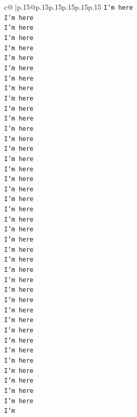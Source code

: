\documentclass{article}
\begin{document}
{\begin{supertabular}{c@{$\;$}|p{.15\linewidth}@{}p{.15\linewidth}p{.15\linewidth}p{.15\linewidth}p{.15\linewidth}p{.15\linewidth}}
{{{\texttt{I'm here} \\
\texttt{I'm here} \\
\texttt{I'm here} \\
\texttt{I'm here} \\
\texttt{I'm here} \\
\texttt{I'm here} \\
\texttt{I'm here} \\
\texttt{I'm here} \\
\texttt{I'm here} \\
\texttt{I'm here} \\
\texttt{I'm here} \\
\texttt{I'm here} \\
\texttt{I'm here} \\
\texttt{I'm here} \\
\texttt{I'm here} \\
\texttt{I'm here} \\
\texttt{I'm here} \\
\texttt{I'm here} \\
\texttt{I'm here} \\
\texttt{I'm here} \\
\texttt{I'm here} \\
\texttt{I'm here} \\
\texttt{I'm here} \\
\texttt{I'm here} \\
\texttt{I'm here} \\
\texttt{I'm here} \\
\texttt{I'm here} \\
\texttt{I'm here} \\
\texttt{I'm here} \\
\texttt{I'm here} \\
\texttt{I'm here} \\
\texttt{I'm here} \\
\texttt{I'm here} \\
\texttt{I'm here} \\
\texttt{I'm here} \\
\texttt{I'm here} \\
\texttt{I'm here} \\
\texttt{I'm here} \\
\texttt{I'm here} \\
\texttt{I'm here} \\
\texttt{I'm} \\
            }
        }
    }
     \\ \\


\end{supertabular}}
\end{document}
